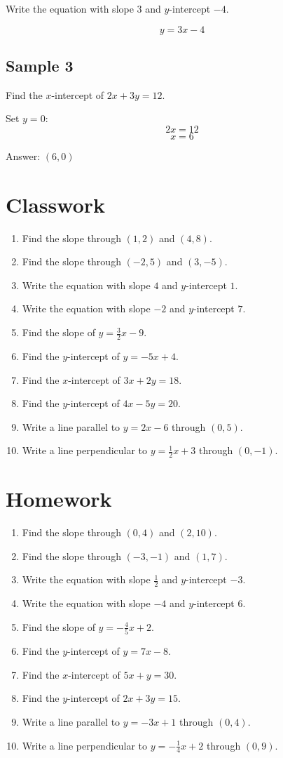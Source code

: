 \documentclass[11pt]{book}
\begin{document}
Write the equation with slope \(3\) and \(y\)-intercept \(-4\).

\[y=3x-4\]

\subsection{Sample 3}

Find the \(x\)-intercept of \(2x+3y=12\).

Set \(y=0\):
\[2x=12\]
\[x=6\]

Answer: \((6,0)\)

\section{Classwork}

\begin{enumerate}
\item Find the slope through \((1,2)\) and \((4,8)\).
\item Find the slope through \((-2,5)\) and \((3,-5)\).
\item Write the equation with slope \(4\) and \(y\)-intercept \(1\).
\item Write the equation with slope \(-2\) and \(y\)-intercept \(7\).
\item Find the slope of \(y=\frac32x-9\).
\item Find the \(y\)-intercept of \(y=-5x+4\).
\item Find the \(x\)-intercept of \(3x+2y=18\).
\item Find the \(y\)-intercept of \(4x-5y=20\).
\item Write a line parallel to \(y=2x-6\) through \((0,5)\).
\item Write a line perpendicular to \(y=\frac12x+3\) through \((0,-1)\).
\end{enumerate}

\section{Homework}

\begin{enumerate}
\item Find the slope through \((0,4)\) and \((2,10)\).
\item Find the slope through \((-3,-1)\) and \((1,7)\).
\item Write the equation with slope \(\frac12\) and \(y\)-intercept \(-3\).
\item Write the equation with slope \(-4\) and \(y\)-intercept \(6\).
\item Find the slope of \(y=-\frac45x+2\).
\item Find the \(y\)-intercept of \(y=7x-8\).
\item Find the \(x\)-intercept of \(5x+y=30\).
\item Find the \(y\)-intercept of \(2x+3y=15\).
\item Write a line parallel to \(y=-3x+1\) through \((0,4)\).
\item Write a line perpendicular to \(y=-\frac14x+2\) through \((0,9)\).
\end{enumerate}
\end{document}
